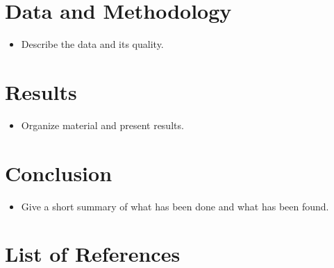 \documentclass[a4paper,12pt]{article}
\providecommand{\tightlist}{%
  \setlength{\itemsep}{0pt}\setlength{\parskip}{0pt}}
\begin{document}
\hypertarget{data-and-methodology}{%
\section{Data and Methodology}\label{data-and-methodology}}
\begin{itemize}
\tightlist
\item
  Describe the data and its quality.
\end{itemize}
\hypertarget{results}{%
\section{Results}\label{results}}
\begin{itemize}
\tightlist
\item
  Organize material and present results.
\end{itemize}
\hypertarget{conclusion}{%
\section{Conclusion}\label{conclusion}}
\begin{itemize}
\tightlist
\item
  Give a short summary of what has been done and what has been found.
\end{itemize}
\newpage

\hypertarget{list-of-references}{%
\section*{List of References}\label{list-of-references}}

\noindent

\setlength{\parindent}{-0.5cm}
\setlength{\leftskip}{0.5cm}
\setlength{\parskip}{8pt}
\end{document}
